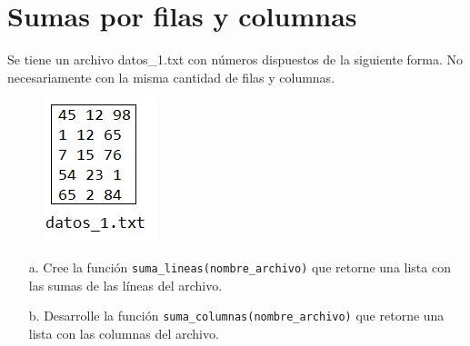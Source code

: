 \section{Sumas por filas y columnas}

Se tiene un archivo datos\_1.txt con números dispuestos de la siguiente forma. No necesariamente con la misma cantidad de filas y columnas.
\begin{figure}[h]
    \centering
    \includegraphics[scale=0.9]{Guia/datos.png}
\end{figure}
\begin{itemize}
    \item[a.] Cree la función \texttt{suma\_lineas(nombre\_archivo)} que retorne una lista con las sumas de las líneas del archivo.
    \item[b.] Desarrolle la función \texttt{suma\_columnas(nombre\_archivo)} que retorne una lista con las columnas del archivo.
\end{itemize}